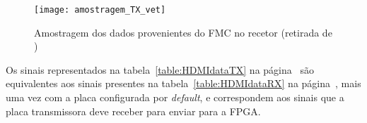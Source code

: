	\begin{figure}[h!]
	\begin{center}
		\leavevmode
		\texttt{[image: amostragem\_TX\_vet]}
		\caption[Amostragem dos dados provenientes do FMC no recetor]{Amostragem dos dados provenientes do FMC no recetor (retirada de \cite{R009})}
		\label{fig:HDMIamostragemTX}
	\end{center}
\end{figure}

Os sinais representados na tabela~\ref{table:HDMIdataTX} na página~\pageref{table:HDMIdataTX} são equivalentes aos sinais presentes na tabela~\ref{table:HDMIdataRX} na página~\pageref{table:HDMIdataRX}, mais uma vez com a placa configurada por \textit{default}, e correspondem aos sinais que a placa transmissora deve receber para enviar para a FPGA.



